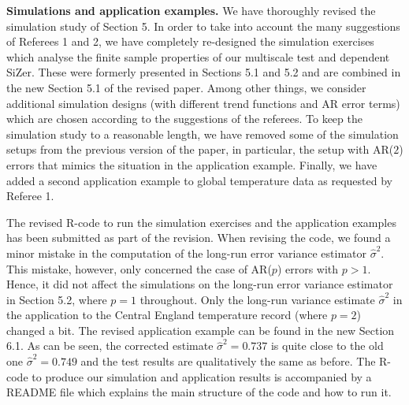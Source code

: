 \documentclass[a4paper,12pt]{article}
\begin{document}
\newpage
\textbf{Simulations and application examples.} We have thoroughly revised the simulation study of Section 5. In order to take into account the many suggestions of Referees 1 and 2, we have completely re-designed the simulation exercises which analyse the finite sample properties of our multiscale test and dependent SiZer. These were formerly presented in Sections 5.1 and 5.2 and are combined in the new Section 5.1 of the revised paper. Among other things, we consider additional simulation designs (with different trend functions and AR error terms) which are chosen according to the suggestions of the referees. To keep the simulation study to a reasonable length, we have removed some of the simulation setups from the previous version of the paper, in particular, the setup with AR($2$) errors that mimics the situation in the application example. Finally, we have added a second application example to global temperature data as requested by Referee 1. 


The revised R-code to run the simulation exercises and the application examples has been submitted as part of the revision. When revising the code, we found a minor mistake in the computation of the long-run error variance estimator $\widehat{\sigma}^2$. This mistake, however, only concerned the case of AR($p$) errors with $p > 1$. Hence, it did not affect the simulations on the long-run error variance estimator in Section 5.2, where $p=1$ throughout. Only the long-run variance estimate $\widehat{\sigma}^2$ in the application to the Central England temperature record (where $p=2$) changed a bit. The revised application example can be found in the new Section 6.1. As can be seen, the corrected estimate $\widehat{\sigma}^2 = 0.737$ is quite close to the old one $\widehat{\sigma}^2 = 0.749$ and the test results are qualitatively the same as before. The R-code to produce our simulation and application results is accompanied by a README file which explains the main structure of the code and how to run it.  




\end{document}
